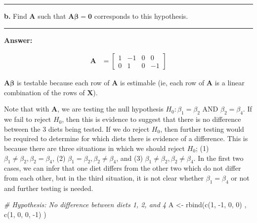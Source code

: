\documentclass[
]{article}
\newenvironment{Shaded}{\begin{snugshade}}{\end{snugshade}}
\newcommand{\CommentTok}[1]{\textcolor[rgb]{0.56,0.35,0.01}{\textit{#1}}}
\newcommand{\DecValTok}[1]{\textcolor[rgb]{0.00,0.00,0.81}{#1}}
\newcommand{\FunctionTok}[1]{\textcolor[rgb]{0.00,0.00,0.00}{#1}}
\newcommand{\NormalTok}[1]{#1}
\newcommand{\OtherTok}[1]{\textcolor[rgb]{0.56,0.35,0.01}{#1}}
\newcommand{\SpecialCharTok}[1]{\textcolor[rgb]{0.00,0.00,0.00}{#1}}
\newcommand{\bmA}{\ensuremath{\bm A}}
\newcommand{\bmX}{\ensuremath{\bm X}}
\newcommand{\bmbeta}{\ensuremath{\bm{\beta}}}
\begin{document}
\begin{center}\rule{0.5\linewidth}{0.5pt}\end{center}

\textbf{b.} Find \(\bmA\) such that \(\bmA\bmbeta = \bm0\) corresponds
to this hypothesis.

\begin{center}\rule{0.5\linewidth}{0.5pt}\end{center}

\textbf{Answer:}

\begin{align*}
\bmA &=
\begin{bmatrix}
1 & -1 & 0 & 0 \\
0 & 1 & 0 & -1 
\end{bmatrix}
\end{align*}

\(\bmA\bmbeta\) is testable because each row of \(\bmA\) is estimable
(ie, each row of \(\bmA\) is a linear combination of the rows of
\(\bmX\)).

Note that with \(\bmA\), we are testing the null hypothesis
\(H_0: \beta_1 = \beta_2\) AND \(\beta_2 = \beta_4\). If we fail to
reject \(H_0\), then this is evidence to suggest that there is no
difference between the 3 diets being tested. If we do reject \(H_0\),
then further testing would be required to determine for which diets
there is evidence of a difference. This is because there are three
situations in which we should reject \(H_0\); (1)
\(\beta_1 \neq \beta_2, \beta_2 = \beta_4\), (2)
\(\beta_1 = \beta_2, \beta_2 \neq \beta_4\), and (3)
\(\beta_1 \neq \beta_2, \beta_2 \neq \beta_4\). In the first two cases,
we can infer that one diet differs from the other two which do not
differ from each other, but in the third situation, it is not clear
whether \(\beta_1 = \beta_4\) or not and further testing is needed.

\begin{Shaded}
\begin{Highlighting}[]
\CommentTok{\# Hypothesis: No difference between diets 1, 2, and 4}
\NormalTok{A }\OtherTok{\textless{}{-}} \FunctionTok{rbind}\NormalTok{(}\FunctionTok{c}\NormalTok{(}\DecValTok{1}\NormalTok{, }\SpecialCharTok{{-}}\DecValTok{1}\NormalTok{, }\DecValTok{0}\NormalTok{, }\DecValTok{0}\NormalTok{)}
\NormalTok{           , }\FunctionTok{c}\NormalTok{(}\DecValTok{1}\NormalTok{, }\DecValTok{0}\NormalTok{, }\DecValTok{0}\NormalTok{, }\SpecialCharTok{{-}}\DecValTok{1}\NormalTok{)}
\NormalTok{           )}
\end{Highlighting}
\end{Shaded}
\end{document}
